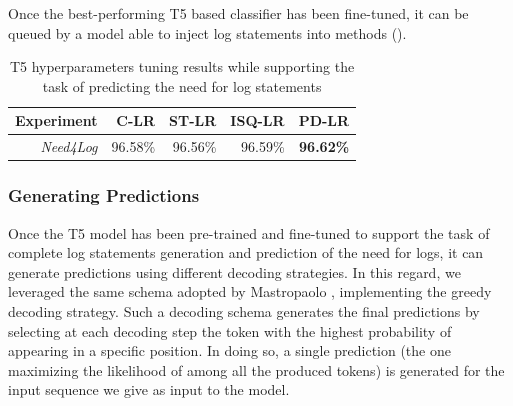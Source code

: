 Once the best-performing T5 based classifier has been fine-tuned, it can be queued by a model able to inject log statements into \java methods ().

  \begin{table}[h!]
	\centering
	\caption{T5 hyperparameters tuning results while supporting the task of predicting the need for log statements}
	\begin{tabular}{rrrrr}
		\hline
		\textbf{Experiment}        & \textbf{C-LR} & \textbf{ST-LR} & \textbf{ISQ-LR}  & \textbf{PD-LR}  \\ \hline
		\textit{Need4Log} & 96.58\%       & 96.56\%        & 96.59\%          & \textbf{96.62\%}\\ \hline
	\end{tabular}
	\label{tab:need4log-hp}
\end{table}

\subsubsection{Generating Predictions}
Once the T5 model has been pre-trained and fine-tuned to support the task of complete log statements generation and prediction of the need for logs, it can generate predictions using different decoding strategies. In this regard, we leveraged the same schema adopted by Mastropaolo \etal \cite{mastropaolo2022using}, implementing the greedy decoding strategy. Such a decoding schema generates the final predictions by selecting at each decoding step the token with the highest probability of appearing in a specific position. In doing so, a single prediction (\ie the one maximizing the likelihood of among all the produced tokens) is generated for the input sequence we give as input to the model.




